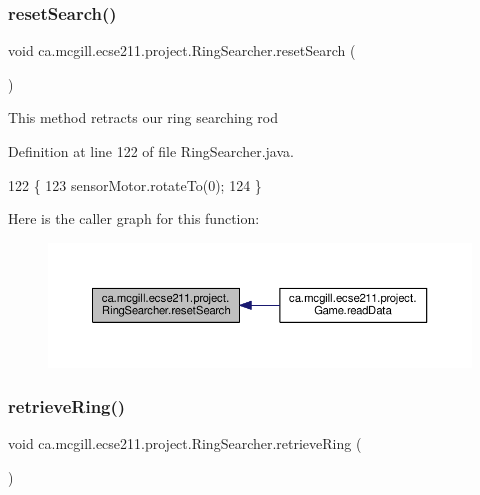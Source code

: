 \subsubsection{\texorpdfstring{reset\+Search()}{resetSearch()}}
{\footnotesize\ttfamily void ca.\+mcgill.\+ecse211.\+project.\+Ring\+Searcher.\+reset\+Search (\begin{DoxyParamCaption}{ }\end{DoxyParamCaption})}

This method retracts our ring searching rod 

Definition at line 122 of file Ring\+Searcher.\+java.


\begin{DoxyCode}
122                             \{
123     sensorMotor.rotateTo(0);
124   \}
\end{DoxyCode}
Here is the caller graph for this function\+:\nopagebreak
\begin{figure}[H]
\begin{center}
\leavevmode
\includegraphics[width=350pt]{classca_1_1mcgill_1_1ecse211_1_1project_1_1_ring_searcher_ad73c50b29163d91292de418101cce21e_icgraph}
\end{center}
\end{figure}
\mbox{\label{classca_1_1mcgill_1_1ecse211_1_1project_1_1_ring_searcher_afca3a0c746b07abb88881d926f4fe71f}} 
\subsubsection{\texorpdfstring{retrieve\+Ring()}{retrieveRing()}}
{\footnotesize\ttfamily void ca.\+mcgill.\+ecse211.\+project.\+Ring\+Searcher.\+retrieve\+Ring (\begin{DoxyParamCaption}{ }\end{DoxyParamCaption})}


